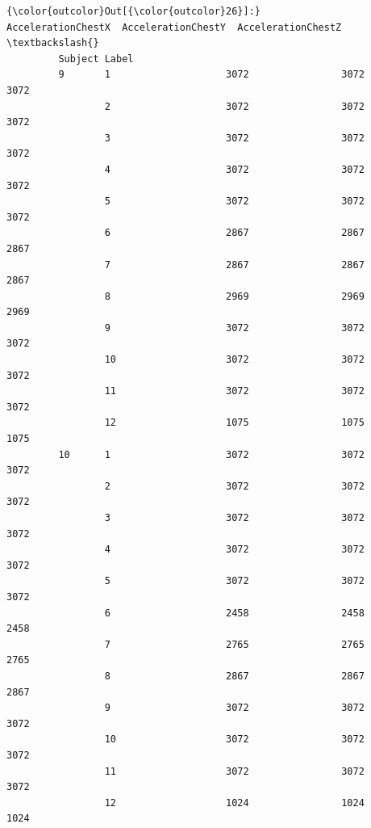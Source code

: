 \documentclass[11pt]{article}
\begin{document}
\begin{Verbatim}[commandchars=\\\{\}]
{\color{outcolor}Out[{\color{outcolor}26}]:}                AccelerationChestX  AccelerationChestY  AccelerationChestZ  \textbackslash{}
         Subject Label                                                               
         9       1                    3072                3072                3072   
                 2                    3072                3072                3072   
                 3                    3072                3072                3072   
                 4                    3072                3072                3072   
                 5                    3072                3072                3072   
                 6                    2867                2867                2867   
                 7                    2867                2867                2867   
                 8                    2969                2969                2969   
                 9                    3072                3072                3072   
                 10                   3072                3072                3072   
                 11                   3072                3072                3072   
                 12                   1075                1075                1075   
         10      1                    3072                3072                3072   
                 2                    3072                3072                3072   
                 3                    3072                3072                3072   
                 4                    3072                3072                3072   
                 5                    3072                3072                3072   
                 6                    2458                2458                2458   
                 7                    2765                2765                2765   
                 8                    2867                2867                2867   
                 9                    3072                3072                3072   
                 10                   3072                3072                3072   
                 11                   3072                3072                3072   
                 12                   1024                1024                1024   
         

\end{Verbatim}
\end{document}
